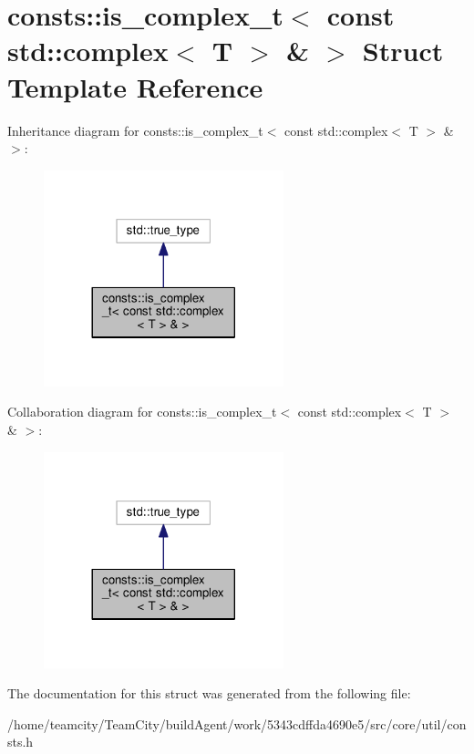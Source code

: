 \hypertarget{structconsts_1_1is__complex__t_3_01const_01std_1_1complex_3_01T_01_4_01_6_01_4}{}\section{consts\+:\+:is\+\_\+complex\+\_\+t$<$ const std\+:\+:complex$<$ T $>$ \& $>$ Struct Template Reference}
\label{structconsts_1_1is__complex__t_3_01const_01std_1_1complex_3_01T_01_4_01_6_01_4}


Inheritance diagram for consts\+:\+:is\+\_\+complex\+\_\+t$<$ const std\+:\+:complex$<$ T $>$ \& $>$\+:
\nopagebreak
\begin{figure}[H]
\begin{center}
\leavevmode
\includegraphics[width=197pt]{structconsts_1_1is__complex__t_3_01const_01std_1_1complex_3_01T_01_4_01_6_01_4__inherit__graph}
\end{center}
\end{figure}


Collaboration diagram for consts\+:\+:is\+\_\+complex\+\_\+t$<$ const std\+:\+:complex$<$ T $>$ \& $>$\+:
\nopagebreak
\begin{figure}[H]
\begin{center}
\leavevmode
\includegraphics[width=197pt]{structconsts_1_1is__complex__t_3_01const_01std_1_1complex_3_01T_01_4_01_6_01_4__coll__graph}
\end{center}
\end{figure}


The documentation for this struct was generated from the following file\+:\begin{DoxyCompactItemize}
\item 
/home/teamcity/\+Team\+City/build\+Agent/work/5343cdffda4690e5/src/core/util/consts.\+h\end{DoxyCompactItemize}
